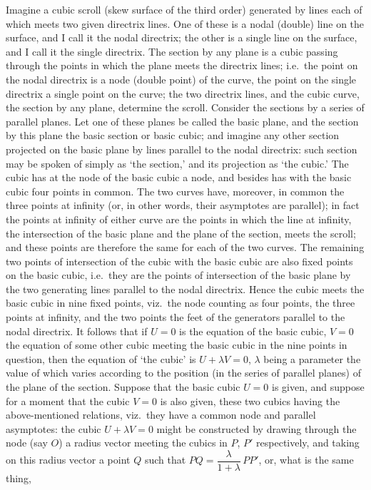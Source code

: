 \documentclass[11pt,a4paper]{article}
\theoremstyle{plain}
\begin{document}
Imagine a cubic scroll (skew surface of the third order) generated by lines each of which meets two given directrix lines. One of these is a nodal (double) line on the surface, and I call it the nodal directrix; the other is a single line on the surface, and I call it the single directrix. The section by any plane is a cubic passing through the points in which the plane meets the directrix lines; i.e.\ the point on the nodal directrix is a node (double point) of the curve, the point on the single directrix a single point on the curve; the two directrix lines, and the cubic curve, the section by any plane, determine the scroll. Consider the sections by a series of parallel planes. Let one of these planes be called the basic plane, and the section by this plane the basic section or basic cubic; and imagine any other section projected on the basic plane by lines parallel to the nodal directrix: such section may be spoken of simply as `the section,' and its projection as `the cubic.' The cubic has at the node of the basic cubic a node, and besides has with the basic cubic four points in common. The two curves have, moreover, in common the three points at infinity (or, in other words, their asymptotes are parallel); in fact the points at infinity of either curve are the points in which the line at infinity, the intersection of the basic plane and the plane of the section, meets the scroll; and these points are therefore the same for each of the two curves. The remaining two points of intersection of the cubic with the basic cubic are also fixed points on the basic cubic, i.e.\ they are the points of intersection of the basic plane by the two generating lines parallel to the nodal directrix. Hence the cubic meets the basic cubic in nine fixed points, viz.\ the node counting as four points, the three points at infinity, and the two points the feet of the generators parallel to the nodal directrix. It follows that if $U = 0$ is the equation of the basic cubic, $V = 0$ the equation of some other cubic meeting the basic cubic in the nine points in question, then the equation of `the cubic' is $U + \lambda V = 0$, $\lambda$ being a parameter the value of which varies according to the position
\newpage
(in the series of parallel planes) of the plane of the section. Suppose that the basic cubic $U = 0$ is given, and suppose for a moment that the cubic $V = 0$ is also given, these two cubics having the above-mentioned relations, viz.\ they have a common node and parallel asymptotes: the cubic $U + \lambda V = 0$ might be constructed by drawing through the node (say $O$) a radius vector meeting the cubics in $P$, $P'$ respectively, and taking on this radius vector a point $Q$ such that $PQ = \dfrac{\lambda}{1+\lambda}\,PP'$, or, what is the same thing,
\end{document}
